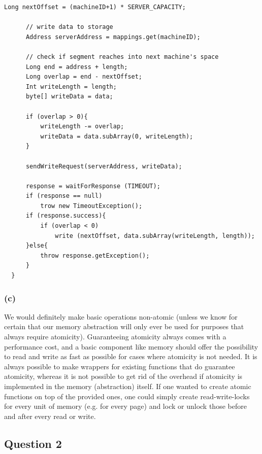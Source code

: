 \documentclass[12pt,a4paper]{article}
\begin{document}
\begin{itemize}
\begin{lstlisting}[basicstyle=\footnotesize]
      Long nextOffset = (machineID+1) * SERVER_CAPACITY;
      
      // write data to storage
      Address serverAddress = mappings.get(machineID);
      
      // check if segment reaches into next machine's space
      Long end = address + length;
      Long overlap = end - nextOffset;
      Int writeLength = length;
      byte[] writeData = data;
      
      if (overlap > 0){
          writeLength -= overlap;
          writeData = data.subArray(0, writeLength);
      }
      
      sendWriteRequest(serverAddress, writeData);
      
      response = waitForResponse (TIMEOUT);
      if (response == null)
          trow new TimeoutException();
      if (response.success){
          if (overlap < 0)
              write (nextOffset, data.subArray(writeLength, length));
      }else{
          throw response.getException();
      }
  }
  \end{lstlisting}
\end{itemize}


\subsubsection*{(c)}
We would definitely make basic operations non-atomic (unless we know for certain that our memory abstraction will only ever be used for purposes that always require atomicity). Guaranteeing atomicity always comes with a performance cost, and a basic component like memory should offer the possibility to read and write as fast as possible for cases where atomicity is not needed. It is always possible to make wrappers for existing functions that do guarantee atomicity, whereas it is not possible to get rid of the overhead if atomicity is implemented in the memory (abstraction) itself. If one wanted to create atomic functions on top of the provided ones, one could simply create read-write-locks for every unit of memory (e.g. for every page) and lock or unlock those before and after every read or write.

\subsection*{Question 2}
\label{sec:eq2}
\end{document}

